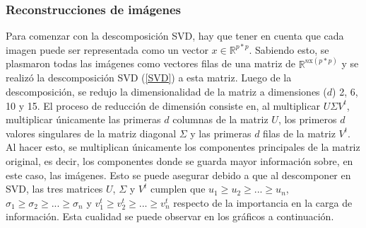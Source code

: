 \documentclass[12pt,a4]{article} %
\begin{document}
\subsubsection{Reconstrucciones de imágenes}
Para comenzar con la descomposición SVD, hay que tener en cuenta que cada imagen puede ser representada como un vector $x \in \mathbb{R}^{p*p}$. Sabiendo esto, se plasmaron todas las imágenes como vectores filas de una matriz de $\mathbb{R}^{n\text{x}(p*p)}$ y se realizó la descomposición SVD (\ref{SVD}) a esta matriz. Luego de la descomposición, se redujo la dimensionalidad de la matriz a dimensiones ($d$) 2, 6, 10 y 15. El proceso de reducción de dimensión consiste en, al multiplicar $U \Sigma V^{t}$, multiplicar únicamente las primeras $d$ columnas de la matriz $U$, los primeros $d$ valores singulares de la matriz diagonal $\Sigma$ y las primeras $d$ filas de la matriz $V^{t}$. Al hacer esto, se multiplican únicamente los componentes principales de la matriz original, es decir, los componentes donde se guarda mayor información sobre, en este caso, las imágenes. Esto se puede asegurar debido a que al descomponer en SVD, las tres matrices $U$, $\Sigma$ y $V^{t}$ cumplen que $u_1 \geq u_2 \geq ... \geq u_n$, $\sigma_1 \geq \sigma_2 \geq ... \geq \sigma_n$ y $v^{t}_1 \geq v^{t}_2 \geq ... \geq v^{t}_n$ respecto de la importancia en la carga de información. Esta cualidad se puede observar en los gráficos a continuación.
\end{document}
